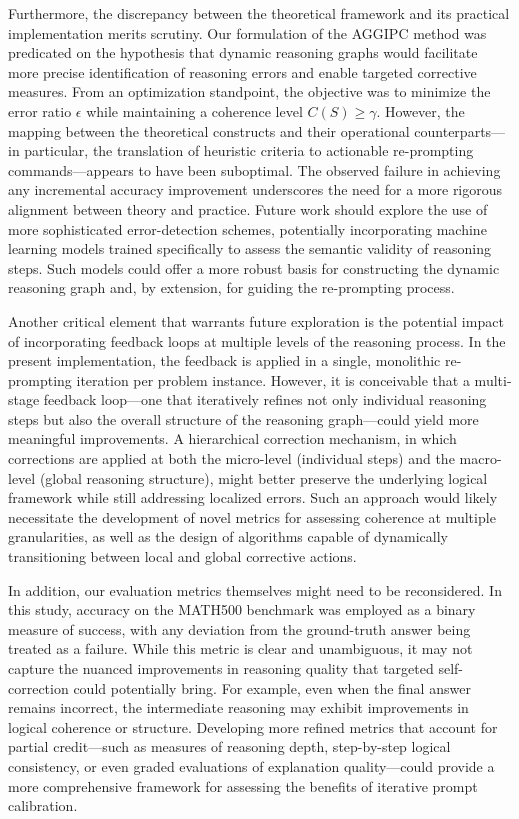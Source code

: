 \documentclass[11pt]{article}
\begin{document}
Furthermore, the discrepancy between the theoretical framework and its practical implementation merits scrutiny. Our formulation of the AGGIPC method was predicated on the hypothesis that dynamic reasoning graphs would facilitate more precise identification of reasoning errors and enable targeted corrective measures. From an optimization standpoint, the objective was to minimize the error ratio \(\epsilon\) while maintaining a coherence level \(C(S) \geq \gamma\). However, the mapping between the theoretical constructs and their operational counterparts—in particular, the translation of heuristic criteria to actionable re-prompting commands—appears to have been suboptimal. The observed failure in achieving any incremental accuracy improvement underscores the need for a more rigorous alignment between theory and practice. Future work should explore the use of more sophisticated error-detection schemes, potentially incorporating machine learning models trained specifically to assess the semantic validity of reasoning steps. Such models could offer a more robust basis for constructing the dynamic reasoning graph and, by extension, for guiding the re-prompting process.

Another critical element that warrants future exploration is the potential impact of incorporating feedback loops at multiple levels of the reasoning process. In the present implementation, the feedback is applied in a single, monolithic re-prompting iteration per problem instance. However, it is conceivable that a multi-stage feedback loop—one that iteratively refines not only individual reasoning steps but also the overall structure of the reasoning graph—could yield more meaningful improvements. A hierarchical correction mechanism, in which corrections are applied at both the micro-level (individual steps) and the macro-level (global reasoning structure), might better preserve the underlying logical framework while still addressing localized errors. Such an approach would likely necessitate the development of novel metrics for assessing coherence at multiple granularities, as well as the design of algorithms capable of dynamically transitioning between local and global corrective actions.

In addition, our evaluation metrics themselves might need to be reconsidered. In this study, accuracy on the MATH500 benchmark was employed as a binary measure of success, with any deviation from the ground-truth answer being treated as a failure. While this metric is clear and unambiguous, it may not capture the nuanced improvements in reasoning quality that targeted self-correction could potentially bring. For example, even when the final answer remains incorrect, the intermediate reasoning may exhibit improvements in logical coherence or structure. Developing more refined metrics that account for partial credit—such as measures of reasoning depth, step-by-step logical consistency, or even graded evaluations of explanation quality—could provide a more comprehensive framework for assessing the benefits of iterative prompt calibration.
\end{document}
